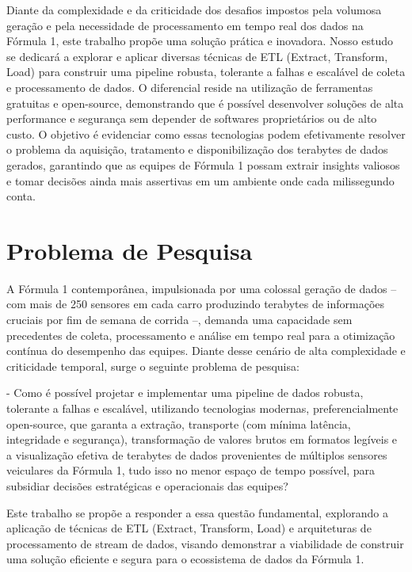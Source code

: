 \documentclass[12pt, %
openright, 
oneside, %
a4paper,    %
brazil]{facom-ufu-abntex2}
\begin{document}
Diante da complexidade e da criticidade dos desafios impostos pela volumosa geração e 
pela necessidade de processamento em tempo real dos dados na Fórmula 1, este trabalho 
propõe uma solução prática e inovadora. Nosso estudo se dedicará a explorar e aplicar 
diversas técnicas de ETL (Extract, Transform, Load) para construir uma pipeline robusta,
tolerante a falhas e escalável de coleta e processamento de dados. O diferencial reside 
na utilização de ferramentas gratuitas e open-source, demonstrando que é possível 
desenvolver soluções de alta performance e segurança sem depender de softwares 
proprietários ou de alto custo. O objetivo é evidenciar como essas tecnologias podem 
efetivamente resolver o problema da aquisição, tratamento e disponibilização dos 
terabytes de dados gerados, garantindo que as equipes de Fórmula 1 possam extrair 
insights valiosos e tomar decisões ainda mais assertivas em um ambiente onde cada 
milissegundo conta.

\section{Problema de Pesquisa}

A Fórmula 1 contemporânea, impulsionada por uma colossal geração de dados – com mais de 
250 sensores em cada carro produzindo terabytes de informações cruciais por fim de semana
de corrida –, demanda uma capacidade sem precedentes de coleta, processamento e análise 
em tempo real para a otimização contínua do desempenho das equipes. Diante desse cenário 
de alta complexidade e criticidade temporal, surge o seguinte problema de pesquisa:

- Como é possível projetar e implementar uma pipeline de dados robusta, tolerante a 
falhas e escalável, utilizando tecnologias modernas, preferencialmente open-source, que 
garanta a extração, transporte (com mínima latência, integridade e segurança), 
transformação de valores brutos em formatos legíveis e a visualização efetiva de 
terabytes de dados provenientes de múltiplos sensores veiculares da Fórmula 1, tudo 
isso no menor espaço de tempo possível, para subsidiar decisões estratégicas e 
operacionais das equipes?

Este trabalho se propõe a responder a essa questão fundamental, explorando a aplicação 
de técnicas de ETL (Extract, Transform, Load) e arquiteturas de processamento de stream 
de dados, visando demonstrar a viabilidade de construir uma solução eficiente e segura 
para o ecossistema de dados da Fórmula 1.
\end{document}
